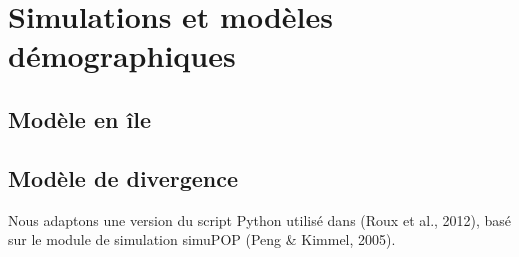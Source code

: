 \documentclass[12pt,twoside]{reedthesis}
\begin{document}
  \section{Simulations et modèles
  démographiques}\label{simulations-et-modeles-demographiques}
  
  \subsection{Modèle en île}\label{modele-en-ile}
  
  \subsection{Modèle de divergence}\label{modele-de-divergence}
  
  Nous adaptons une version du script Python utilisé dans (Roux et al.,
  2012), basé sur le module de simulation simuPOP (Peng \& Kimmel, 2005).
  
\end{document}
